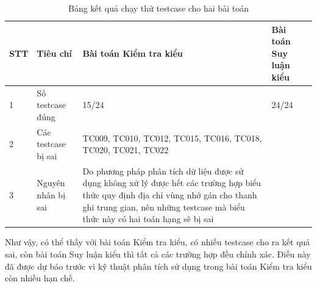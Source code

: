 \begin{table}[h!]
	\centering
	\begin{tabular}{ |p{0.7cm}| p{3cm}| p{5cm}| p{5cm}|}
		\hline
		
		STT & Tiêu chí & Bài toán Kiểm tra kiểu & Bài toán Suy luận kiểu\\
		\hline
		1 & Số testcase đúng & 15/24 & 24/24\\
		\hline
		2 & Các testcase bị sai &TC009, TC010, TC012, TC015, TC016, TC018, TC020, TC021, TC022 &\\
		\hline
		3 & Nguyên nhân bị sai & Do phương pháp phân tích dữ liệu được sử dụng không xử lý được hết các trường hợp biểu thức quy định địa chỉ vùng nhớ gán cho thanh ghi trung gian, nên những testcase mà biểu thức này có hai toán hạng sẽ bị sai & \\
		\hline
	\end{tabular}
	
	
	\label{table:table3}
	\caption{Bảng kết quả chạy thử testcase cho hai bài toán}
\end{table}
\newpage
Như vậy, có thể thấy với bài toán Kiểm tra kiểu, có nhiều testcase cho ra kết quả sai, còn bài toán Suy luận kiểu thì tất cả các trường hợp đều chính xác. Điều này đã được dự báo trước vì kỹ thuật phân tích sử dụng trong bài toán Kiểm tra kiểu còn nhiều hạn chế.\\

